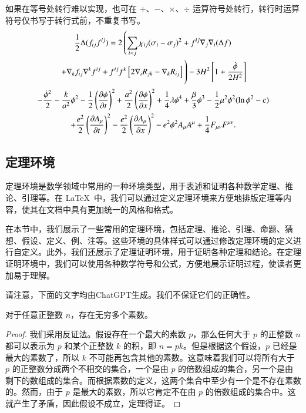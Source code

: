 如果在等号处转行难以实现，也可在 $+$、$-$、$\times$、$\div$ 运算符号处转行，转行时运算符号仅书写于转行式前，不重复书写。
\begin{multline}
\frac{1}{2} \Delta (f_{ij} f^{ij}) =
2 \left(\sum_{i<j} \chi_{ij}(\sigma_{i} - \sigma_{j})^{2}
+ f^{ij} \nabla_{j} \nabla_{i} (\Delta f) \right. \\
\left. + \nabla_{k} f_{ij} \nabla^{k} f^{ij} +
f^{ij} f^{k} \left[2\nabla_{i}R_{jk}- \nabla_{k} R_{ij} \right] \vphantom{\sum_{i<j}} \right)
- 3H^{2}\left[1+\frac{\dot{\phi}}{2H^2}\right] \\
- \frac{\dot{\phi}^{2}}{2} - \frac{k}{a^{2}}\phi^{2} - \frac{1}{2}\left(\frac{\partial\phi}{\partial t}\right)^{2} + \frac{a^2}{2}\left(\frac{\partial\phi}{\partial x}\right)^{2}
+ \frac{1}{4}\lambda\phi^{4} + \frac{\beta}{3}\phi^{3} -\frac{1}{2}\mu^{2}\phi^{2}(\ln{\phi^{2}} - c) \\
+ \frac{e^{2}}{2}\left(\frac{\partial A_{\mu}}{\partial t}\right)^{2} - \frac{e^{2}}{2}\left(\frac{\partial A_{\mu}}{\partial x}\right)^{2}
- e^{2}\phi^{2}A_{\mu}A^{\mu} + \frac{1}{4}F_{\mu\nu}F^{\mu\nu}.
\end{multline}

\subsection{定理环境}

定理环境是数学领域中常用的一种环境类型，用于表述和证明各种数学定理、推论、引理等。在 \LaTeX\ 中，我们可以通过定义定理环境来方便地排版定理等内容，使其在文档中具有更加统一的风格和格式。

在本节中，我们展示了一些常用的定理环境，包括定理、推论、引理、命题、猜想、假设、定义、例、注等。这些环境的具体样式可以通过修改定理环境的定义进行自定义。此外，我们还展示了定理证明环境，用于证明各种定理和结论。在定理证明环境中，我们可以使用各种数学符号和公式，方便地展示证明过程，使读者更加易于理解。

请注意，下面的文字均由ChatGPT生成。我们不保证它们的正确性。

\begin{thm}
对于任意正整数 $n$，存在无穷多个素数。
\end{thm}

\begin{proof}
我们采用反证法。假设存在一个最大的素数 $p$，那么任何大于 $p$ 的正整数 $n$ 都可以表示为 $p$ 和某个正整数 $k$ 的积，即 $n = pk$。但是根据这个假设，$p$ 已经是最大的素数了，所以 $k$ 不可能再包含其他的素数。这意味着我们可以将所有大于 $p$ 的正整数分成两个不相交的集合，一个是由 $p$ 的倍数组成的集合，另一个是由剩下的数组成的集合。而根据素数的定义，这两个集合中至少有一个是不存在素数的。然而，由于 $p$ 是最大的素数，所以它肯定不在由 $p$ 的倍数组成的集合中。这就产生了矛盾，因此假设不成立，定理得证。
\end{proof}

